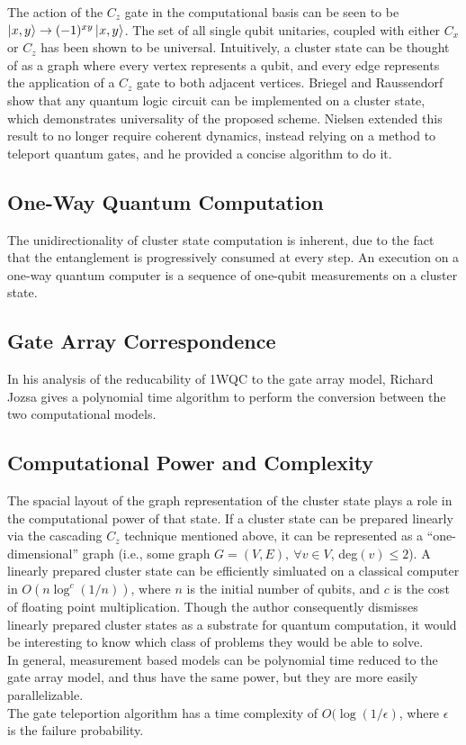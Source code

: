 \documentclass[twocolumn]{IEEEtran11}
\begin{document}
The action of the $C_z$ gate in the computational basis can be seen to be $\left|\mspace{0.5mu} x,y \mspace{0.5mu}\right\rangle \to (-1)^{xy}\left|\mspace{0.5mu} x,y \mspace{0.5mu}\right\rangle$. The set of all single qubit unitaries, coupled with either $C_x$ or $C_z$ has been shown to be universal\cite{brylinski2002universal}. Intuitively, a cluster state can be thought of as a graph where every vertex represents a qubit, and every edge represents the application of a $C_z$ gate to both adjacent vertices. Briegel and Raussendorf show that any quantum logic circuit can be implemented on a cluster state, which demonstrates universality of the proposed scheme\cite{briegel2000measurements}. Nielsen\cite{nielsen108020universal} extended this result to no longer require coherent dynamics, instead relying on a method to teleport quantum gates, and he provided a concise algorithm to do it. 

\subsection{One-Way Quantum Computation}
The unidirectionality of cluster state computation is inherent, due to the fact that the entanglement is progressively consumed at every step. An execution on a one-way quantum computer is a sequence of one-qubit measurements on a cluster state\cite{jorrand2005unifying}.


\subsection{Gate Array Correspondence}
In his analysis of the reducability of 1WQC to the gate array model, Richard Jozsa gives a polynomial time algorithm to perform the conversion between the two computational models\cite{jozsa2006introduction}. 

\subsection{Computational Power and Complexity}
The spacial layout of the graph representation of the cluster state plays a role in the computational power of that state. If a cluster state can be prepared linearly via the cascading $C_z$ technique mentioned above, it can be represented as a  ``one-dimensional'' graph (i.e., some graph $G=(V,E),\ \forall v\in V$, deg$(v)\leq 2$). A linearly prepared cluster state can be efficiently simluated on a classical computer in $O(n\log ^c (1/n))$, where $n$ is the initial number of qubits, and $c$ is the cost of floating point multiplication\cite{nielsen2006cluster}. Though the author consequently dismisses linearly prepared cluster states as a substrate for quantum computation, it would be interesting to know which class of problems they would be able to solve. \\
In general, measurement based models can be polynomial time reduced to the gate array model, and thus have the same power, but they are more easily parallelizable\cite{jozsa2006introduction}.\\
The gate teleportion algorithm\cite{nielsen108020universal} has a time complexity of $O(\log (1/\epsilon)$, where $\epsilon$ is the failure probability. 



\end{document}

